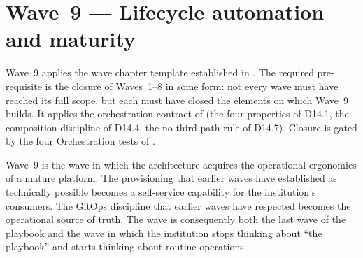 
\chapter{Wave~9 --- Lifecycle automation and maturity}
\label{ch:wave9-lifecycle}

\begin{caveatbox}[Dependencies]
\noindent Wave~9 applies the wave chapter template established in
. The required pre-requisite is
the closure of Waves~1--8 in some form: not every wave must have
reached its full scope, but each must have closed the elements
on which Wave~9 builds. It applies the orchestration contract of
 (the four properties of D14.1, the
composition discipline of D14.4, the no-third-path rule of
D14.7). Closure is gated by the four Orchestration tests of
.
\end{caveatbox}

Wave~9 is the wave in which the architecture acquires the
operational ergonomics of a mature platform. The provisioning
that earlier waves have established as technically possible
becomes a self-service capability for the institution's
consumers. The GitOps discipline that earlier waves have
respected becomes the operational source of truth. The wave is
consequently both the last wave of the playbook and the wave in
which the institution stops thinking about ``the playbook'' and
starts thinking about routine operations.

